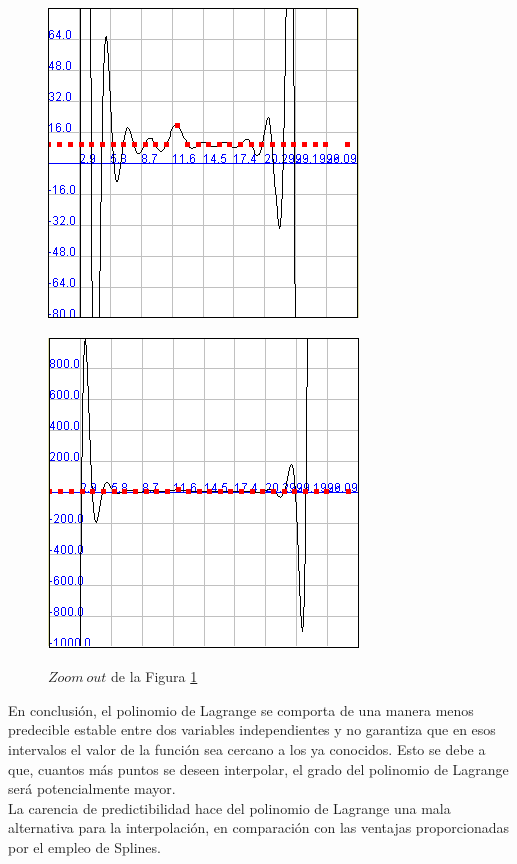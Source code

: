 \documentclass[a4paper]{article}
\begin{document}
\begin{figure}
	\caption{}
	\begin{center}
	\includegraphics[scale=1]{imagenes/LagrangeX12a20}
	\label{LagrangeX12a20}
  \end{center}
\end{figure}

\begin{figure}
	\caption{$Zoom \ out$ de la Figura \ref{LagrangeX12a20}}
	\begin{center}
	\includegraphics[scale=1]{imagenes/LagrangeX12a20(zoomOut)}
	\label{LagrangeX12a20(zoomOut)}
  \end{center}
\end{figure}

\bigskip

En conclusión, el polinomio de Lagrange se comporta de una manera menos predecible estable entre dos variables independientes y no garantiza que en esos intervalos el valor de la función sea cercano a los ya conocidos. Esto se debe a que, cuantos más puntos se deseen interpolar, el grado del polinomio de Lagrange será potencialmente mayor.\\
La carencia de predictibilidad hace del polinomio de Lagrange una mala alternativa para la interpolación, en comparación con las ventajas proporcionadas por el empleo de Splines.\\
\end{document}
